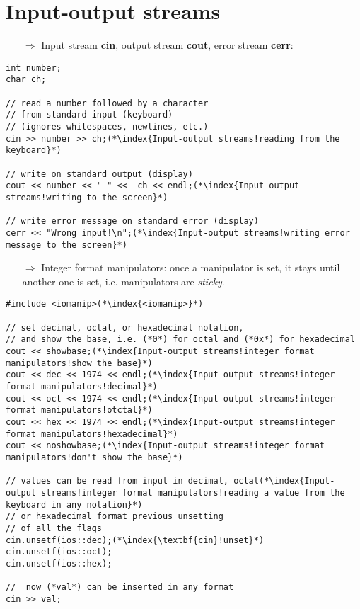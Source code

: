 \documentclass[10pt]{article}
\begin{document}
\section{Input-output streams}
\small
\begin{enumerate}
\item[$\Rightarrow$] Input stream \textbf{cin}, output stream \textbf{cout}, error stream \textbf{cerr}:
\end{enumerate}
\begin{lstlisting}
int number;
char ch;

// read a number followed by a character
// from standard input (keyboard)
// (ignores whitespaces, newlines, etc.)
cin >> number >> ch;(*\index{Input-output streams!reading from the keyboard}*)

// write on standard output (display)
cout << number << " " <<  ch << endl;(*\index{Input-output streams!writing to the screen}*)

// write error message on standard error (display)
cerr << "Wrong input!\n";(*\index{Input-output streams!writing error message to the screen}*)
\end{lstlisting}
\begin{enumerate}
\item[$\Rightarrow$] Integer format manipulators: once a  manipulator is set, it stays until another one is set, i.e. manipulators are \emph{sticky}.
\end{enumerate}
\begin{lstlisting}
#include <iomanip>(*\index{<iomanip>}*)

// set decimal, octal, or hexadecimal notation,
// and show the base, i.e. (*0*) for octal and (*0x*) for hexadecimal
cout << showbase;(*\index{Input-output streams!integer format manipulators!show the base}*)
cout << dec << 1974 << endl;(*\index{Input-output streams!integer format manipulators!decimal}*)
cout << oct << 1974 << endl;(*\index{Input-output streams!integer format manipulators!otctal}*)
cout << hex << 1974 << endl;(*\index{Input-output streams!integer format manipulators!hexadecimal}*)
cout << noshowbase;(*\index{Input-output streams!integer format manipulators!don't show the base}*)

// values can be read from input in decimal, octal(*\index{Input-output streams!integer format manipulators!reading a value from the keyboard in any notation}*)
// or hexadecimal format previous unsetting
// of all the flags
cin.unsetf(ios::dec);(*\index{\textbf{cin}!unset}*)
cin.unsetf(ios::oct);
cin.unsetf(ios::hex);

//  now (*val*) can be inserted in any format
cin >> val;
\end{lstlisting}
\end{document}
